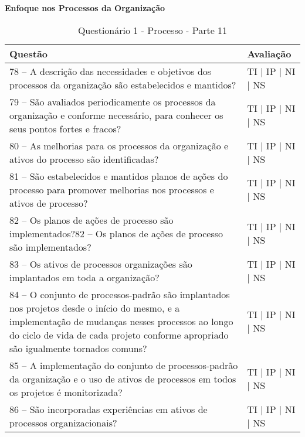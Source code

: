 \documentclass[openany,10pt,a4paper]{article}
\begin{document}
\begin{appendix}
\begin{table}[h]
\textbf{Enfoque nos Processos da Organização}
	\centering
	\caption{Questionário 1 - Processo - Parte 11}
	\begin{tabular}{p{3.5in}p{2in}}		
		\toprule
		\textbf{Questão}  & \textbf{Avaliação}\\ 
		\midrule
		78 – A descrição das necessidades e objetivos dos processos da organização são estabelecidos e 
mantidos?
 & TI | IP | NI | NS \\
        \midrule
		79 – São avaliados periodicamente os processos da organização e conforme necessário, para 
conhecer os seus pontos fortes e fracos?
 & TI | IP | NI | NS \\
		\midrule
		80 – As melhorias para os processos da organização e ativos do processo são identificadas?
 & TI | IP | NI | NS \\
		\midrule
        81 – São estabelecidos e mantidos planos de ações do processo para promover melhorias nos 
processos e ativos de processo?
 & TI | IP | NI | NS \\
		\midrule
		82 – Os planos de ações de processo são implementados?82 – Os planos de ações de processo são implementados?
  & TI | IP | NI | NS \\
		\midrule
		83 – Os ativos de processos organizações são implantados em toda a organização?
 & TI | IP | NI | NS \\
        \midrule
		84 – O conjunto de processos-padrão são implantados nos projetos desde o início do mesmo, e 
a implementação de mudanças nesses processos ao longo do ciclo de vida de cada projeto
conforme apropriado são igualmente tornados comuns? 
 & TI | IP | NI | NS \\
 \midrule
		85 – A implementação do conjunto de processos-padrão da organização e o uso de ativos de
processos em todos os projetos é monitorizada? 
 & TI | IP | NI | NS \\\midrule
		86 – São incorporadas experiências em ativos de processos organizacionais?
 & TI | IP | NI | NS \\
		\bottomrule
	\end{tabular} 
	\label{tab:tabela1}
\end{table}


\end{appendix}
\end{document}
